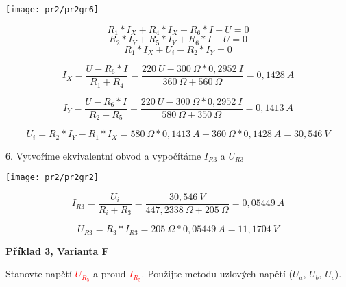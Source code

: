 \documentclass[a4paper,12pt]{article}
\begin{document}
\begin{center}
\texttt{[image: pr2/pr2gr6]}
\end{center}

\begin{equation*}
R_1 * I_X + R_4 * I_X + R_6 * I - U = 0
\end{equation*}
\begin{equation*}
R_2 * I_Y + R_5 * I_Y + R_6 * I - U = 0
\end{equation*}
\begin{equation*}
R_1 * I_X + U_i - R_2 * I_Y = 0
\end{equation*}

\begin{equation*}
I_X = \frac{U - R_6 * I}{R_1 + R_4} = \frac{220\ U - 300\ \Omega * 0,2952\ I}{360\ \Omega + 560\ \Omega} = 0,1428\ A
\end{equation*}

\begin{equation*}
I_Y = \frac{U - R_6 * I}{R_2 + R_5} = \frac{220\ U - 300\ \Omega * 0,2952\ I}{580\ \Omega + 350\ \Omega} = 0,1413\ A
\end{equation*}


\begin{equation*}
U_i = R_2 * I_Y - R_1 * I_X = 580\ \Omega * 0,1413\ A - 360\ \Omega * 0,1428\ A  = 30,546\ V
\end{equation*}

6. Vytvoříme ekvivalentní obvod a vypočítáme $I_{R3}$ a $U_{R3}$ 

\begin{center}
\texttt{[image: pr2/pr2gr2]}
\end{center}

\begin{equation*}
I_{R3} = \frac{U_i}{R_i + R_3} = \frac{30,546\ V}{447,2338\ \Omega + 205\ \Omega} = 0,05449\ A 
\end{equation*}

\begin{equation*}
U_{R3} = R_3 * I_{R3} = 205\ \Omega * 0,05449\ A = 11,1704\ V
\end{equation*}

\newpage

\begin{center}
\textbf{Příklad 3, Varianta F}
\end{center}
\bigskip

Stanovte napětí \textcolor{red}{$U_{R_5}$} a proud \textcolor{red}{$I_{R_5}$}.
Použijte metodu uzlových napětí ($U_a$, $U_b$, $U_c$).\\
\end{document}
